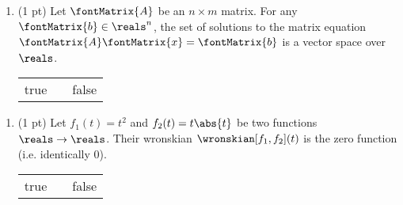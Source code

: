 \qsep



\begin{enumerate}[resume,label=(\alph*)]
\item\label{itm : E4Q1b} (1 pt) Let $\fontMatrix{A}$ be an $n \times m$ matrix. For any $\fontMatrix{b} \in \reals^{n}$, the set of solutions to the matrix equation $\fontMatrix{A} \fontMatrix{x} = \fontMatrix{b}$ is a vector space over $\reals$.
\begin{center}
\begin{tabular}{c c c}
true	&	\hspace{1in}	&	false
\end{tabular}
\end{center}
\end{enumerate}




\qsep



\begin{enumerate}[resume,label=(\alph*)]
\item\label{itm : E4Q1c} (1 pt) Let $f_{1}(t) = t^{2}$ and $f_{2}(t) = t \abs{t}$ be two functions $\reals \rightarrow \reals$. Their wronskian $\wronskian[f_{1},f_{2}](t)$ is the zero function (i.e. identically $0$). 
\begin{center}
\begin{tabular}{c c c}
true	&	\hspace{1in}	&	false
\end{tabular}
\end{center}
\end{enumerate}

